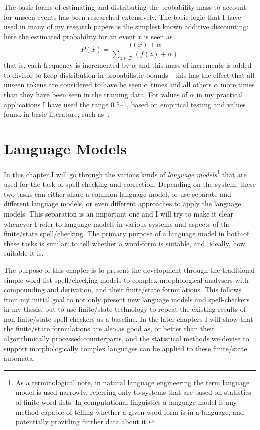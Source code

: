 \documentclass[officiallayout]{unihelcompling}
\begin{document}
The basic forms of estimating and distributing the probability mass to account
for unseen events has been researched extensively. The basic logic that I have
used in many of my research papers is the simplest known additive discounting:
here the estimated probability for an event $x$ is seen as 
\begin{equation}
    P(\hat{x}) = \frac{f(x) + \alpha}{\sum_{z \in \mathcal{D}}(f(z) + \alpha)}
\end{equation}
that is, each frequency is incremented by $\alpha$ and this mass of increments
is added to divisor to keep distribution in probabilistic bounds---this has the
effect that all unseen tokens are considered to have be seen $\alpha$ times and
all others $\alpha$ more times than they have been seen in the training data.
For values of $\alpha$ in my practical applications I have used the range
0.5--1, based on empirical testing and values found in basic literature, such
as~\citet{manning1999foundations}.



\chapter{Language Models}
\label{chap:language-models}

In this chapter I will go through the various kinds of
\emph{language models}\footnote{As a terminological note, in natural language
    engineering the term language model is used narrowly, referring only
    to systems that are based on statistics of finite word lists. In
    computational linguistics a language model is any method capable of
    telling whether a given word-form is in a language, and potentially
    providing further data about it.} that are
used for the task of spell checking and correction.  Depending on the system,
these two tasks can either share a common language model, or use separate and
different language models, or even different approaches to apply the language
models. This separation is an important one and I will try to make it clear
whenever I refer to language models in various systems and aspects of the
finite\-/state spell\-/checking.  The primary purpose of a language model in
both of these tasks is similar: to tell whether a word-form is suitable, and,
ideally, how suitable it is.

The purpose of this chapter is to present the development through the
traditional simple word-list spell\-/checking models to complex morphological
analysers with compounding and derivation, and their finite\-/state formulations.
This follows from my initial goal to not only present new language models and
spell-checkers in my thesis, but to use finite\-/state technology to repeat the
existing results of non-finite\-/state spell-checkers as a baseline. In the later
chapters I will show that the finite\-/state formulations are also as good as, or
better than their algorithmically processed counterparts, and the statistical
methods we devise to support morphologically complex languages can be applied
to these finite\-/state automata.
\end{document}
